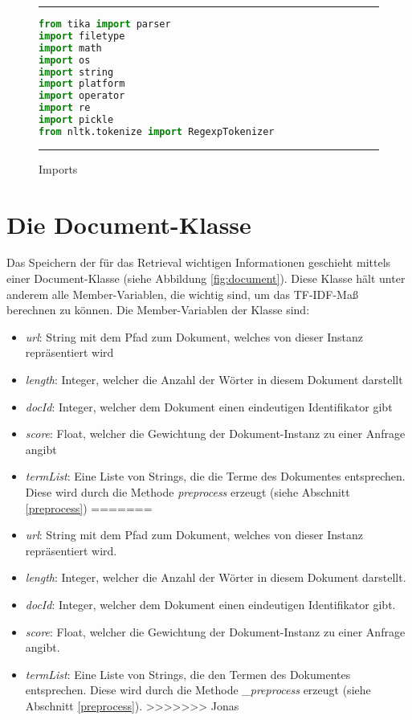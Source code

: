 \begin{figure}
	\rule{\textwidth}{0.4pt}
		\begin{lstlisting}[language=Python]
from tika import parser
import filetype
import math
import os
import string
import platform
import operator
import re
import pickle
from nltk.tokenize import RegexpTokenizer
		\end{lstlisting}
	\rule{\textwidth}{0.4pt}
	\caption{Imports}
	\label{fig:import}
\end{figure}

\section{Die Document-Klasse}\label{die-document-klasse}

Das Speichern der für das Retrieval wichtigen Informationen geschieht mittels einer Document-Klasse (siehe Abbildung \ref{fig:document}). Diese Klasse hält unter anderem alle Member-Variablen, die wichtig sind, um das TF-IDF-Maß berechnen zu können. Die Member-Variablen der Klasse sind:
\begin{itemize}
<<<<<<< HEAD
	\item \textit{url}: String mit dem Pfad zum Dokument, welches von dieser Instanz repräsentiert wird
	\item \textit{length}: Integer, welcher die Anzahl der Wörter in diesem Dokument darstellt
	\item \textit{docId}: Integer, welcher dem Dokument einen eindeutigen Identifikator gibt
	\item \textit{score}: Float, welcher die Gewichtung der Dokument-Instanz zu einer Anfrage angibt
	\item \textit{termList}: Eine Liste von Strings, die die Terme des Dokumentes entsprechen. Diese wird durch die Methode \textit{preprocess} erzeugt (siehe Abschnitt \ref{preprocess})
=======
	\item \textit{url}: String mit dem Pfad zum Dokument, welches von dieser Instanz repräsentiert wird.
	\item \textit{length}: Integer, welcher die Anzahl der Wörter in diesem Dokument darstellt.
	\item \textit{docId}: Integer, welcher dem Dokument einen eindeutigen Identifikator gibt.
	\item \textit{score}: Float, welcher die Gewichtung der Dokument-Instanz zu einer Anfrage angibt.
	\item \textit{termList}: Eine Liste von Strings, die den Termen des Dokumentes entsprechen. Diese wird durch die Methode \textit{\_preprocess} erzeugt (siehe Abschnitt \ref{preprocess}).
>>>>>>> Jonas
\end{itemize} 

